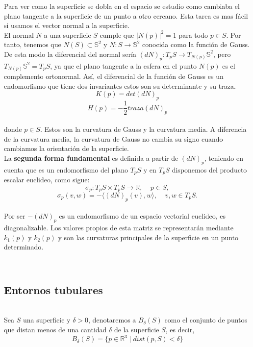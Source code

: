 Para ver como la superficie se dobla en el espacio se estudio como cambiaba el plano tangente a la superficie de un punto a otro cercano. Esta tarea es mas fácil si usamos el vector normal a la superficie.
${ }$\\

El normal $N$ a una superficie $S$ cumple que $|N(p)|^2 = 1$ para todo $p \in S$. Por tanto, tenemos que $N(S) \subset \mathbb{S}^2$ y $N : S \to \mathbb{S}^2$ conocida como la función de Gauss. De esta modo la diferencial del normal sería $(dN)_p : T_p S \to T_{N(p)} \mathbb{S}^2$, pero $T_{N(p)} \mathbb{S}^2 = T_p S$, ya que el plano tangente a la esfera en el punto $N(p)$ es el complemento ortonormal. Así, el diferencial de la función de Gauss es un endomorfismo que tiene dos invariantes estos son su determinante y su traza.
${ }$\\
$$ K(p) = det(dN)_p $$
$$ H(p) = - \frac{1}{2} traza(dN)_p $$
${ }$\\
donde $p \in S$. Estos son la curvatura de Gauss y la curvatura media. A diferencia de la curvatura media, la curvatura de Gauss no cambia su signo cuando cambiamos la orientación de la superficie.
${ }$\\

La \textbf{segunda forma fundamental} es definida a partir de $(dN)_p$, teniendo en cuenta que es un endomorfismo del plano $T_p S$ y en $T_p S$ disponemos del producto escalar euclideo, como sigue:
${ }$\\
$$ \sigma_p : T_pS \times T_pS \to \mathbb{R}, \;\;\;\; p \in S, $$
$$ \sigma_p(v,w) = - \langle (dN)_p(v), w \rangle, \;\;\;\; v,w \in T_pS. $$
${ }$\\


Por ser $-(dN)_p$ es un endomorfismo de un espacio vectorial euclideo, es diagonalizable. Los valores propios de esta matriz se representarán mediante $k_1(p)$ y $k_2(p)$ y son las curvaturas principales de la superficie en un punto determinado.


${ }$\\
\subsection{Entornos tubulares}
${ }$\\

Sea $S$ una superficie y $\delta > 0$, denotaremos a $B_{\delta}(S)$ como el conjunto de puntos que distan menos de una cantidad $\delta$ de la superficie $S$, es decir,
${ }$\\
$$ B_{\delta}(S) = \{p \in \mathbb{R}^3 \; | \; dist(p,S) < \delta\} $$
${ }$\\



